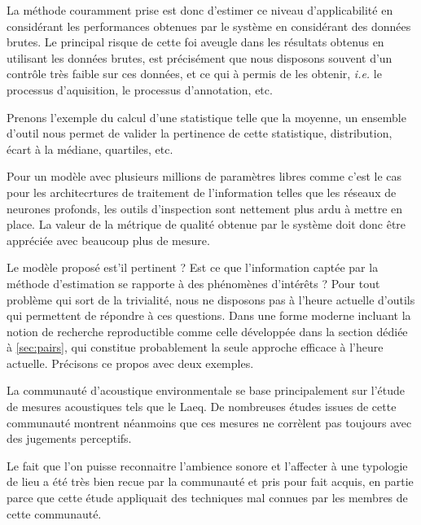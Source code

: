   La méthode couramment prise est donc d'estimer ce niveau d'applicabilité
  en considérant les performances obtenues par le système en considérant des données brutes. Le principal risque de cette foi aveugle dans les résultats obtenus en utilisant les données brutes, est précisément que nous disposons souvent d'un contrôle très faible sur ces données, et ce qui à permis de les obtenir, \textit{i.e.} le processus d'aquisition, le processus d'annotation, etc.

  Prenons l'exemple du calcul d'une statistique telle que la moyenne, un ensemble d'outil nous permet de valider la pertinence de cette statistique, distribution, écart à la médiane, quartiles, etc.

  Pour un modèle avec plusieurs millions de paramètres libres comme c'est le cas pour les architecrtures de traitement de l'information telles que les réseaux de neurones profonds, les outils d'inspection sont nettement plus ardu à mettre en place. La valeur de la métrique de qualité obtenue par le système doit donc être appréciée avec beaucoup plus de mesure.

  Le modèle proposé est'il pertinent ? Est ce que l'information captée par la méthode d'estimation se rapporte à des phénomènes d'intérêts ? Pour tout problème qui sort de la trivialité, nous ne disposons pas à l'heure actuelle d'outils qui permettent de répondre à ces questions. Dans une forme moderne incluant la notion de recherche reproductible comme celle développée dans la section dédiée à \ref{sec:pairs}, qui constitue probablement la seule approche efficace à l'heure actuelle. Précisons ce propos avec deux exemples.

  La communauté d'acoustique environmentale se base principalement sur l'étude de mesures acoustiques tels que le Laeq. De nombreuses études issues de cette communauté montrent néanmoins que ces mesures ne corrèlent pas toujours avec des jugements perceptifs.

  Le fait que l'on puisse reconnaitre l'ambience sonore et l'affecter à une typologie de lieu a été très bien recue par la communauté et pris pour fait acquis, en partie parce que cette étude appliquait des techniques mal connues par les membres de cette communauté.

